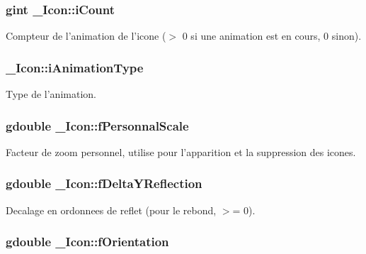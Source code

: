 \subsubsection{\setlength{\rightskip}{0pt plus 5cm}gint {\bf \_\-Icon::iCount}}\label{struct__Icon_470706f7184913004a81a32c0c96ff40}


Compteur de l'animation de l'icone ($>$ 0 si une animation est en cours, 0 sinon). 

\subsubsection{ {\bf \_\-Icon::iAnimationType}}\label{struct__Icon_f6f5d75a4d7bc97ffd1698c5b9f228c9}


Type de l'animation. 

\subsubsection{\setlength{\rightskip}{0pt plus 5cm}gdouble {\bf \_\-Icon::fPersonnalScale}}\label{struct__Icon_d82607fc388efb4d012e5a8de872f8ca}


Facteur de zoom personnel, utilise pour l'apparition et la suppression des icones. 

\subsubsection{\setlength{\rightskip}{0pt plus 5cm}gdouble {\bf \_\-Icon::fDeltaYReflection}}\label{struct__Icon_68af6b183dd833a9c1a9c7072d20522c}


Decalage en ordonnees de reflet (pour le rebond, $>$= 0). 

\subsubsection{\setlength{\rightskip}{0pt plus 5cm}gdouble {\bf \_\-Icon::fOrientation}}\label{struct__Icon_30c29ae51f620d51dcee811ebd1c8295}


